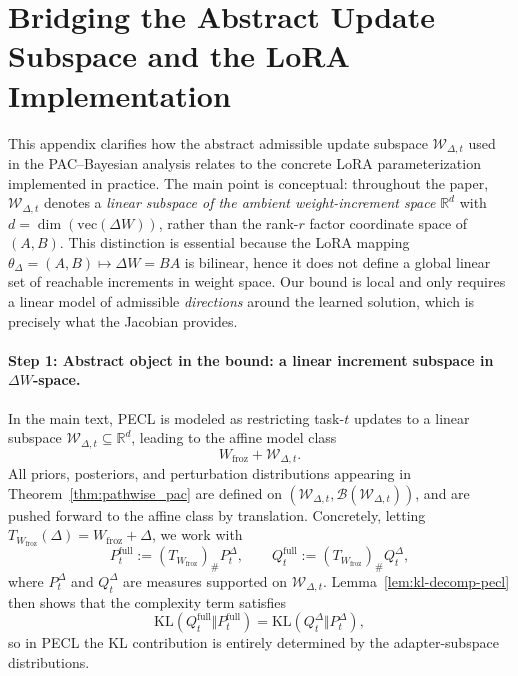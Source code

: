 \documentclass{article}
\theoremstyle{plain}
\theoremstyle{definition}
\theoremstyle{remark}
\begin{document}
\section{Bridging the Abstract Update Subspace and the LoRA Implementation}
\label{app:lora_subspace_bridge}

This appendix clarifies how the abstract admissible update subspace
$\mathcal W_{\Delta,t}$ used in the PAC--Bayesian analysis relates to the concrete LoRA
parameterization implemented in practice.
The main point is conceptual: throughout the paper, $\mathcal W_{\Delta,t}$ denotes a
\emph{linear subspace of the ambient weight-increment space} $\mathbb R^d$ with
$d=\dim(\mathrm{vec}(\Delta W))$, rather than the rank-$r$ factor coordinate space of $(A,B)$.
This distinction is essential because the LoRA mapping $\theta_\Delta=(A,B)\mapsto \Delta W=BA$
is bilinear, hence it does not define a global linear set of reachable increments in weight space.
Our bound is local and only requires a linear model of admissible \emph{directions} around the
learned solution, which is precisely what the Jacobian provides.

\paragraph{Step 1: Abstract object in the bound: a linear increment subspace in $\Delta W$-space.}
In the main text, PECL is modeled as restricting task-$t$ updates to a linear subspace
$\mathcal W_{\Delta,t}\subseteq\mathbb R^d$, leading to the affine model class
\[
W_{\mathrm{froz}}+\mathcal W_{\Delta,t}.
\]
All priors, posteriors, and perturbation distributions appearing in
Theorem~\ref{thm:pathwise_pac} are defined on $(\mathcal W_{\Delta,t},\mathcal B(\mathcal W_{\Delta,t}))$,
and are pushed forward to the affine class by translation.
Concretely, letting $T_{W_{\mathrm{froz}}}(\Delta)=W_{\mathrm{froz}}+\Delta$, we work with
\[
P_t^{\mathrm{full}} := (T_{W_{\mathrm{froz}}})_{\#} P_t^{\Delta},
\qquad
Q_t^{\mathrm{full}} := (T_{W_{\mathrm{froz}}})_{\#} Q_t^{\Delta},
\]
where $P_t^\Delta$ and $Q_t^\Delta$ are measures supported on $\mathcal W_{\Delta,t}$.
Lemma~\ref{lem:kl-decomp-pecl} then shows that the complexity term satisfies
\[
\mathrm{KL}\!\left(Q_t^{\mathrm{full}}\Vert P_t^{\mathrm{full}}\right)
=
\mathrm{KL}\!\left(Q_t^{\Delta}\Vert P_t^{\Delta}\right),
\]
so in PECL the KL contribution is entirely determined by the adapter-subspace distributions.
\end{document}
